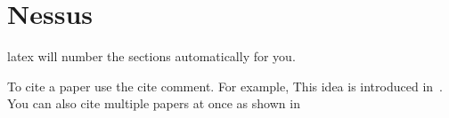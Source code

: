 \section{Nessus}

latex will number the sections automatically for you.

To cite a paper use the cite comment. For example, This
idea is introduced in~\cite{tosuncikm2002}. You can also
cite multiple papers at once as shown 
in~\cite{tosunicme2000,tosuncikm2002,tosunitcc2001,tosunMM01}